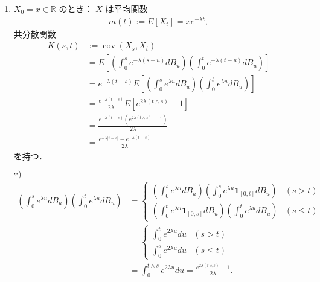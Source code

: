\documentclass{jsarticle}
\begin{document}
\begin{enumerate}[label=(\roman*)]
    \item
    $X_{0}=x\in\mathbb{R}$ のとき：
    $X$ は平均関数
    \begin{align}
        m(t)
        := E[X_{t}]
        = xe^{-\lambda t},
    \end{align}
    共分散関数
    \begin{align}
        K(s, t)
        &:= \operatorname{cov}(X_{s}, X_{t}) \\
        &= E[(\int_{0}^{s}e^{-\lambda(s-u)}dB_{u})(\int_{0}^{t}e^{-\lambda(t-u)}dB_{u})] \\
        &= e^{-\lambda(t+s)}E[(\int_{0}^{s}e^{\lambda u}dB_{u})(\int_{0}^{t}e^{\lambda u}dB_{u})] \\
        &= \frac{e^{-\lambda(t+s)}}{2\lambda}E[e^{2\lambda(t\wedge s)}-1] \\
        &= \frac{e^{-\lambda(t+s)}(e^{2\lambda(t\wedge s)}-1)}{2\lambda} \\
        &= \frac{e^{-\lambda\lvert t-s\rvert}-e^{-\lambda(t+s)}}{2\lambda}
    \end{align}
    を持つ．

    \begin{screen}
        $\because)$
        \begin{align}
            (\int_{0}^{s}e^{\lambda u}dB_{u})(\int_{0}^{t}e^{\lambda u}dB_{u})
            &= 
            \begin{cases}
                \displaystyle (\int_{0}^{s}e^{\lambda u}dB_{u})(\int_{0}^{s}e^{\lambda u}\bm{1}_{[0, t]}dB_{u}) & (s>t) \\
                \displaystyle (\int_{0}^{t}e^{\lambda u}\bm{1}_{[0, s]}dB_{u})(\int_{0}^{t}e^{\lambda u}dB_{u}) & (s\le t)
            \end{cases} \\
            &= 
            \begin{cases}
                \displaystyle \int_{0}^{t}e^{2\lambda u}du & (s>t) \\
                \displaystyle \int_{0}^{s}e^{2\lambda u}du & (s\le t)
            \end{cases} \\
            &= \int_{0}^{t\wedge s}e^{2\lambda u}du
            = \frac{e^{2\lambda(t\wedge s)}-1}{2\lambda}.
        \end{align}
    \end{screen}
    

\end{enumerate}
\end{document}
